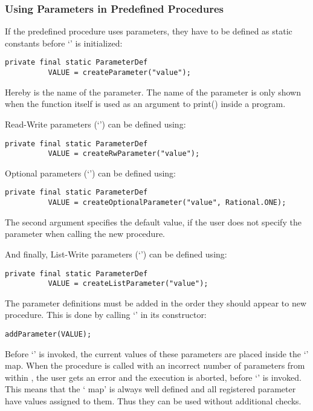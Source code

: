 \subsubsection*{Using Parameters in Predefined Procedures}

If the predefined procedure uses parameters, they have to be defined as static constants before
`' is initialized:
\begin{lstlisting}[frame=none,numbers=none]
private final static ParameterDef
          VALUE = createParameter("value");
\end{lstlisting}

Hereby  is the name of the parameter. The name of the parameter is only shown when the function itself is used as an argument to print() inside a \SetlX{} program.

Read-Write parameters (`') can be defined using:
\begin{lstlisting}[frame=none,numbers=none]
private final static ParameterDef
          VALUE = createRwParameter("value");
\end{lstlisting}

Optional parameters (`') can be defined using:
\begin{lstlisting}[frame=none,numbers=none]
private final static ParameterDef
          VALUE = createOptionalParameter("value", Rational.ONE);
\end{lstlisting}
The second argument specifies the default value, if the user does not specify the parameter when calling the new procedure.

And finally, List-Write parameters (`\command{*}') can be defined using:
\begin{lstlisting}[frame=none,numbers=none]
private final static ParameterDef
          VALUE = createListParameter("value");
\end{lstlisting}

The parameter definitions must be added in the order they should appear to new procedure. This is done by calling `' in its constructor:
\begin{lstlisting}[frame=none,numbers=none]
addParameter(VALUE);
\end{lstlisting}


Before `' is invoked, the current values of these parameters are placed inside the `' map.
When the procedure is called with an incorrect number of parameters from within \SetlX{}, the user gets an error and the execution is aborted, before `' is invoked.
This means that the ` map' is always well defined and all registered parameter have values assigned to them.
Thus they can be used without additional checks.

